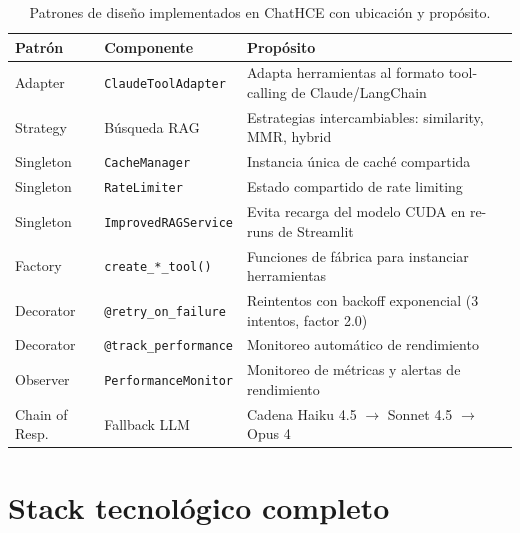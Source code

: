 \begin{table}[H]
\centering
\caption{Patrones de diseño implementados en ChatHCE con ubicación y propósito.}
\label{tab:appendix_patrones}
\footnotesize
\begin{tabularx}{\columnwidth}{llX}
\toprule
\textbf{Patrón} & \textbf{Componente} & \textbf{Propósito} \\
\midrule
Adapter & \texttt{ClaudeToolAdapter} & Adapta herramientas al formato tool-calling de Claude/LangChain \\
\addlinespace
Strategy & Búsqueda \ac{RAG} & Estrategias intercambiables: similarity, MMR, hybrid \\
\addlinespace
Singleton & \texttt{CacheManager} & Instancia única de caché compartida \\
\addlinespace
Singleton & \texttt{RateLimiter} & Estado compartido de rate limiting \\
\addlinespace
Singleton & \texttt{ImprovedRAGService} & Evita recarga del modelo CUDA en re-runs de Streamlit \\
\addlinespace
Factory & \texttt{create\_*\_tool()} & Funciones de fábrica para instanciar herramientas \\
\addlinespace
Decorator & \texttt{@retry\_on\_failure} & Reintentos con backoff exponencial (3 intentos, factor 2.0) \\
\addlinespace
Decorator & \texttt{@track\_performance} & Monitoreo automático de rendimiento \\
\addlinespace
Observer & \texttt{PerformanceMonitor} & Monitoreo de métricas y alertas de rendimiento \\
\addlinespace
Chain of Resp. & Fallback \ac{LLM} & Cadena Haiku 4.5 $\to$ Sonnet 4.5 $\to$ Opus 4 \\
\bottomrule
\end{tabularx}
\end{table}

\section{Stack tecnológico completo}
\label{sec:appendix_stack}

